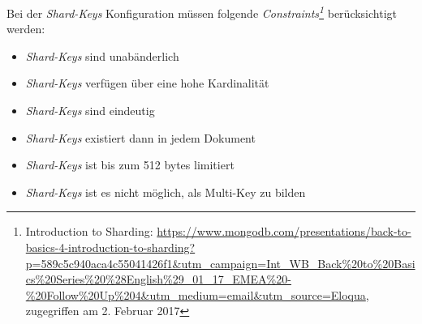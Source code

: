 Bei der \textit{Shard-Keys} Konfiguration müssen folgende \textit{Constraints\footnote{Introduction to Sharding: \url{https://www.mongodb.com/presentations/back-to-basics-4-introduction-to-sharding?p=589c5c940aca4c55041426f1&utm_campaign=Int_WB_Back\%20to\%20Basics\%20Series\%20\%28English\%29_01_17_EMEA\%20-\%20Follow\%20Up\%204&utm_medium=email&utm_source=Eloqua}, zugegriffen am 2. Februar 2017}} berücksichtigt werden:
\begin{itemize}
\item \textit{Shard-Keys} sind unabänderlich
\item \textit{Shard-Keys} verfügen über eine hohe Kardinalität
\item \textit{Shard-Keys} sind eindeutig
\item \textit{Shard-Keys} existiert dann in jedem Dokument
\item \textit{Shard-Keys} ist bis zum 512 bytes limitiert
\item \textit{Shard-Keys} ist es nicht möglich, als Multi-Key zu bilden
\end{itemize}

